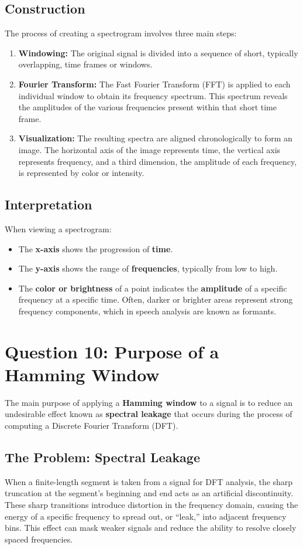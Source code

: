 \documentclass[a4paper,12pt]{article}
\begin{document}
\subsection*{Construction}
The process of creating a spectrogram involves three main steps:
\begin{enumerate}
    \item \textbf{Windowing:} The original signal is divided into a sequence of short, typically overlapping, time frames or windows.
    \item \textbf{Fourier Transform:} The Fast Fourier Transform (FFT) is applied to each individual window to obtain its frequency spectrum. This spectrum reveals the amplitudes of the various frequencies present within that short time frame.
    \item \textbf{Visualization:} The resulting spectra are aligned chronologically to form an image. The horizontal axis of the image represents time, the vertical axis represents frequency, and a third dimension, the amplitude of each frequency, is represented by color or intensity.
\end{enumerate}

\subsection*{Interpretation}
When viewing a spectrogram:
\begin{itemize}
    \item The \textbf{x-axis} shows the progression of \textbf{time}.
    \item The \textbf{y-axis} shows the range of \textbf{frequencies}, typically from low to high.
    \item The \textbf{color or brightness} of a point indicates the \textbf{amplitude} of a specific frequency at a specific time. Often, darker or brighter areas represent strong frequency components, which in speech analysis are known as formants.
\end{itemize}


\section{Question 10: Purpose of a Hamming Window}
The main purpose of applying a \textbf{Hamming window} to a signal is to reduce an undesirable effect known as \textbf{spectral leakage} that occurs during the process of computing a Discrete Fourier Transform (DFT).

\subsection*{The Problem: Spectral Leakage}
When a finite-length segment is taken from a signal for DFT analysis, the sharp truncation at the segment's beginning and end acts as an artificial discontinuity. These sharp transitions introduce distortion in the frequency domain, causing the energy of a specific frequency to spread out, or ``leak,'' into adjacent frequency bins. This effect can mask weaker signals and reduce the ability to resolve closely spaced frequencies.
\end{document}
